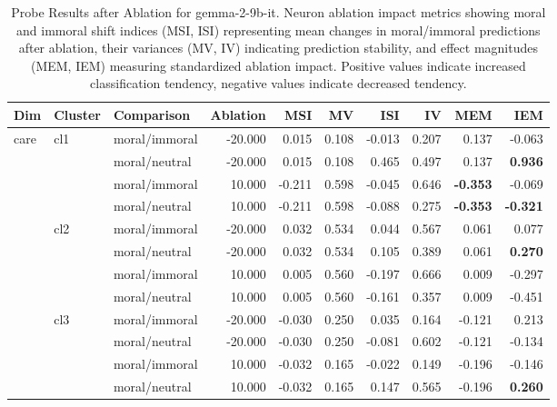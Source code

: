 \documentclass[runninghheads]{llncs}
\begin{document}
\begin{table}[!ht]
    \centering
    \caption{Probe Results after Ablation for gemma-2-9b-it. Neuron ablation impact metrics showing moral and immoral shift indices (MSI, ISI) representing mean changes in moral/immoral predictions after ablation, their variances (MV, IV) indicating prediction stability, and effect magnitudes (MEM, IEM) measuring standardized ablation impact. Positive values indicate increased classification tendency, negative values indicate decreased tendency.}
    \begingroup
    \scriptsize
    \begin{tabular}{|l|l|l|r|r|r|r|r|r|r|}
    \hline
        \textbf{Dim} & \textbf{Cluster} & \textbf{Comparison} & \textbf{Ablation} & \textbf{MSI} & \textbf{MV} & \textbf{ISI} & \textbf{IV} & \textbf{MEM} & \textbf{IEM} \\ 
            \hline\hline
        \multirow{12}{*}{care} & \multirow{4}{*}{cl1} & moral/immoral & -20.000 & 0.015 & 0.108 & -0.013 & 0.207 & 0.137 & -0.063 \\ 
        & & moral/neutral & -20.000 & 0.015 & 0.108 & 0.465 & 0.497 & 0.137 & \textbf{0.936} \\
        & & moral/immoral & 10.000 & -0.211 & 0.598 & -0.045 & 0.646 & \textbf{-0.353} & -0.069 \\
        & & moral/neutral & 10.000 & -0.211 & 0.598 & -0.088 & 0.275 & \textbf{-0.353} & \textbf{-0.321} \\ 
         \cline{2-10}
        & \multirow{4}{*}{cl2} & moral/immoral & -20.000 & 0.032 & 0.534 & 0.044 & 0.567 & 0.061 & 0.077 \\
        &  & moral/neutral & -20.000 & 0.032 & 0.534 & 0.105 & 0.389 & 0.061 & \textbf{0.270} \\ 
        &  & moral/immoral & 10.000 & 0.005 & 0.560 & -0.197 & 0.666 & 0.009 & -0.297 \\ 
        &  & moral/neutral & 10.000 & 0.005 & 0.560 & -0.161 & 0.357 & 0.009 & -0.451 \\ 
         \cline{2-10}
        & \multirow{4}{*}{cl3} & moral/immoral & -20.000 & -0.030 & 0.250 & 0.035 & 0.164 & -0.121 & 0.213 \\ 
        &  & moral/neutral & -20.000 & -0.030 & 0.250 & -0.081 & 0.602 & -0.121 & -0.134 \\ 
        &  & moral/immoral & 10.000 & -0.032 & 0.165 & -0.022 & 0.149 & -0.196 & -0.146 \\ 
        &  & moral/neutral & 10.000 & -0.032 & 0.165 & 0.147 & 0.565 & -0.196 & \textbf{0.260} \\

\end{tabular}
\end{table}
\end{document}
